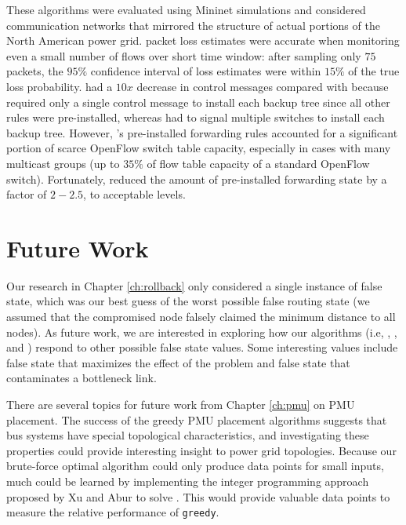 These algorithms were evaluated using Mininet simulations and considered communication networks that mirrored the structure of actual portions of the North American power grid.
\pcnt packet loss estimates were accurate when monitoring even a small number of flows over short time window: after sampling only $75$ packets, the $95\%$ confidence interval of \pcnt loss estimates 
were within $15\%$ of the true loss probability. 
\pre had a $10x$ decrease in control messages compared with \post because \pre required only a single control message to install each backup tree since all other rules were pre-installed,
whereas \post had to signal multiple switches to install each backup tree. 
However, \pres's pre-installed forwarding rules accounted for a significant portion of scarce OpenFlow switch table capacity, especially in cases with many multicast groups (up to $35\%$ of
flow table capacity of a standard OpenFlow switch). Fortunately, \merge reduced the amount of pre-installed forwarding state by a factor of $2-2.5$, to acceptable levels.


\section{Future Work}
\label{sec:thesis-future}

Our research in Chapter \ref{ch:rollback} %
only considered a single instance of false state, which was our best guess of the worst possible false routing state (we assumed that the compromised
node falsely claimed the minimum distance to all nodes).  As future work, we are interested in exploring how our algorithms (i.e, \seconds, \purges, and \cprs) 
respond to other possible false state values. Some interesting values include false state that maximizes the effect of the \infinity problem and false state that contaminates a bottleneck link.



There are several topics for future work from Chapter \ref{ch:pmu} on PMU placement. The success of the greedy PMU placement algorithms suggests that bus systems have special topological characteristics,
and investigating these properties could provide interesting insight to power grid topologies. 
Because our brute-force optimal algorithm could only produce data points for small inputs, much could be learned by implementing  
the integer programming approach proposed by Xu and Abur \cite{Xu04} to solve \fulls.  This would provide valuable data points to measure the relative performance of {\tt greedy}.


